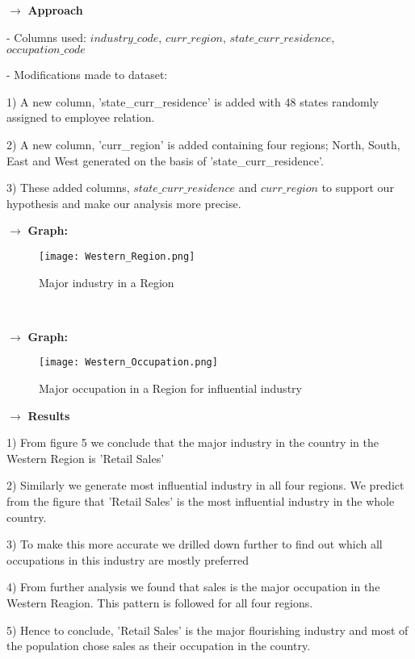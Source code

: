 \documentclass[9pt, twocolumn]{article}
\begin{document}
\par \noindent $\rightarrow$ \textbf{Approach}\\
\par - Columns used: $industry\_code$, $curr\_region$, $state\_curr\_residence$, $occupation\_code$\\
\par - Modifications made to dataset:\\
\par 1) A new column, 'state\_curr\_residence' is added with 48 states randomly assigned to employee relation. \\
\par 2) A new column, 'curr\_region' is added containing four regions; North, South, East and West generated on the basis of 'state\_curr\_residence'.\\
\par 3) These added columns, $state\_curr\_residence$ and $curr\_region$ to support our hypothesis and make our analysis more precise.

\par \noindent $\rightarrow$ \textbf{Graph:}
	\begin{figure}[ht!]
		\centering
		\texttt{[image: Western\_Region.png]}
		\caption{Major industry in a Region}
	\end{figure}\\

\par \noindent $\rightarrow$ \textbf{Graph:}
	\begin{figure}[ht!]
		\centering
		\texttt{[image: Western\_Occupation.png]}
		\caption{Major occupation in a Region for influential industry}
	\end{figure}
\par \noindent $\rightarrow$ \textbf{Results}
\par 1) From figure 5 we conclude that the major industry in the country in the Western Region is 'Retail Sales'
\par 2) Similarly we generate most influential industry in all four regions. We predict from the figure that 'Retail Sales' is the most influential industry in the whole country.
\par 3) To make this more accurate we drilled down further to find out which all occupations in this industry are mostly preferred
\par 4) From further analysis we found that sales is the major occupation in the Western Reagion. This pattern is followed for all four regions.
\par 5) Hence to conclude, 'Retail Sales' is the major flourishing industry and most of the population chose sales as their occupation in the country.\\
\end{document}
